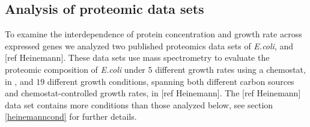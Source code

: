 \subsection{Analysis of proteomic data sets}
To examine the interdependence of protein concentration and growth rate across expressed genes we analyzed two published proteomics data sets of \emph{E.coli}, \cite{Valgepea2013} and [ref Heinemann].
These data sets use mass spectrometry to evaluate the proteomic composition of \emph{E.coli} under $5$ different growth rates using a chemostat, in \cite{Valgepea2013}, and $19$ different growth conditions, spanning both different carbon sources and chemostat-controlled growth rates, in [ref Heinemann].
The [ref Heinemann] data set contains more conditions than those analyzed below, see section \ref{heinemanncond} for further details.